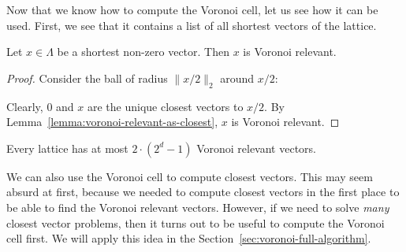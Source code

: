 Now that we know how to compute the Voronoi cell,
let us see how it can be used.
First, we see that it contains a list of all shortest vectors of the lattice.

\begin{lemma}
  Let $x \in \Lambda$ be a shortest non-zero vector.
  Then $x$ is Voronoi relevant.
\end{lemma}
\begin{proof}
  Consider the ball of radius $\|x/2\|_2$ around $x/2$:
  \begin{center}
  \end{center}
  Clearly, $0$ and $x$ are the unique closest vectors to $x/2$.
  By Lemma~\ref{lemma:voronoi-relevant-as-closest}, $x$ is Voronoi relevant.
\end{proof}

\begin{corollary}
  Every lattice has at most $2 \cdot (2^d - 1)$ Voronoi relevant vectors.
\end{corollary}

We can also use the Voronoi cell to compute closest vectors.
This may seem absurd at first,
because we needed to compute closest vectors in the first place to be able to
find the Voronoi relevant vectors.
However, if we need to solve \emph{many} closest vector problems,
then it turns out to be useful to compute the Voronoi cell first.
We will apply this idea in the Section~\ref{sec:voronoi-full-algorithm}.

